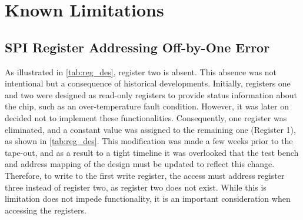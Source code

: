 \section{Known Limitations}
\label{sec:limitations}

\subsection{SPI Register Addressing Off-by-One Error}
\label{subsec:spi_register_offset}
As illustrated in \autoref{tab:reg_des}, register two is absent. This absence was not intentional but a consequence of historical developments. Initially, registers one and two were designed as read-only registers to provide status information about the chip, such as an over-temperature fault condition. However, it was later on decided not to implement these functionalities. Consequently, one register was eliminated, and a constant value was assigned to the remaining one (Register 1), as shown in \autoref{tab:reg_des}.
This modification was made a few weeks prior to the tape-out, and as a result to a tight timeline it was overlooked that the test bench and address mapping of the design must be updated to reflect this change. Therefore, to write to the first write register, the access must address register three instead of register two, as register two does not exist. While this is limitation does not impede functionality, it is an important consideration when accessing the registers.

